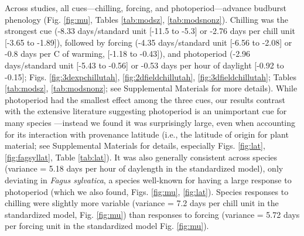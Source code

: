 \documentclass{article}
\begin{document}
\par Across studies, all cues---chilling, forcing, and photoperiod---advance budburst phenology (Fig. \ref{fig:mu}, Tables \ref{tab:modsz}, \ref{tab:modsnonz}). Chilling was the strongest cue (-8.33 days/standard unit [-11.5 to -5.3] or -2.76 days per chill unit [-3.65 to -1.89]), followed by forcing (-4.35 days/standard unit [-6.56 to -2.08] or -0.8 days per \degree C of warming, [-1.18 to -0.43]), and photoperiod (-2.96 days/standard unit [-5.43 to -0.56] or -0.53 days per hour of daylight [-0.92 to  -0.15]; Figs. \ref{fig:3dexpchillutah}, \ref{fig:2dfieldchillutah}, \ref{fig:3dfieldchillutah}; Tables \ref{tab:modsz}, \ref{tab:modsnonz}; see Supplemental Materials for more details). While photoperiod had the smallest effect among the three cues, our results contrast with the extensive literature suggesting photoperiod is an unimportant cue for many species \emph{\citep{zohner2016,fu2019}}---instead we found it was surprisingly large, even when accounting for its interaction with provenance latitude (i.e., the latitude of origin for plant material; see Supplemental Materials for details, especially Figs. \ref{fig:lat}, \ref{fig:fagsyllat}, Table \ref{tab:lat}). It was also generally consistent across species (variance = 5.18 days per hour of daylength in the standardized model), only deviating in \emph{Fagus sylvatica}, a species well-known for having a large response to photoperiod (which we also found, Figs. \ref{fig:mu}, \ref{fig:lat}). Species responses to chilling were slightly more variable (variance = 7.2 days per chill unit in the standardized model, Fig. \ref{fig:mu}) than responses to forcing (variance = 5.72 days per forcing unit in the standardized model Fig. \ref{fig:mu}). 
\end{document}

